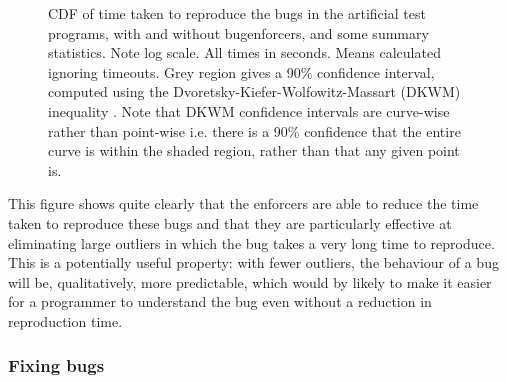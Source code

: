 \begin{figure}
  \caption{CDF of time taken to reproduce the bugs in the artificial
    test programs, with and without \glspl{bugenforcer}, and some
    summary statistics.  Note log scale.  All times in seconds.  Means
    calculated ignoring timeouts.  Grey region gives a 90\% confidence
    interval, computed using the Dvoretsky-Kiefer-Wolfowitz-Massart
    (DKWM) inequality .  Note that DKWM
    confidence intervals are curve-wise rather than point-wise
    i.e. there is a 90\% confidence that the entire curve is within
    the shaded region, rather than that any given point is.}
\end{figure}

This figure shows quite clearly that the enforcers are able to reduce
the time taken to reproduce these bugs and that they are particularly
effective at eliminating large outliers in which the bug takes a very
long time to reproduce.  This is a potentially useful property: with
fewer outliers, the behaviour of a bug will be, qualitatively, more
predictable, which would by likely to make it easier for a programmer
to understand the bug even without a reduction in reproduction time.

\subsubsection{Fixing bugs}


